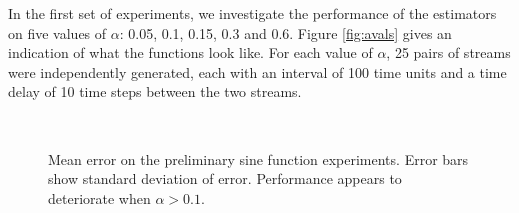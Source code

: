 \documentclass[a4paper,11pt]{article}
\begin{document}
    In the first set of experiments, we investigate the performance of the
    estimators on five values of $\alpha$: 0.05, 0.1, 0.15, 0.3 and 0.6. Figure
    \ref{fig:avals} gives an indication of what the functions look like. For
    each value of $\alpha$, 25 pairs of streams were independently generated, each
    with an interval of 100 time units and a time delay of 10 time steps between the
    two streams. 
    \begin{figure}[h!]
    \\
    \caption{Mean error on the preliminary sine function experiments. Error bars show standard
    deviation of error. Performance appears to deteriorate when $\alpha>0.1$.}
    \label{fig:prelimerror}
    \end{figure}
    
\end{document}
